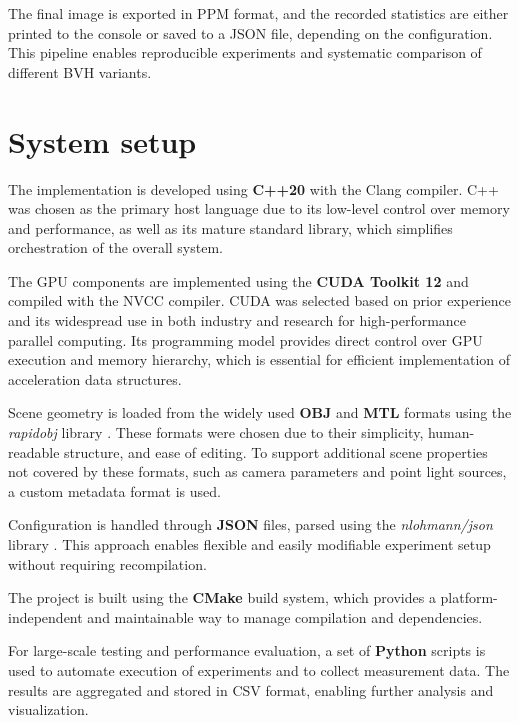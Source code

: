 The final image is exported in PPM format, and the recorded statistics are either printed to the console or saved to a JSON file, depending on the configuration. This pipeline enables reproducible experiments and systematic comparison of different BVH variants.

\section{System setup}

The implementation is developed using \textbf{C++20} with the Clang compiler. C++ was chosen as the primary host language due to its low-level control over memory and performance, as well as its mature standard library, which simplifies orchestration of the overall system.

The GPU components are implemented using the \textbf{CUDA Toolkit 12} and compiled with the NVCC compiler. CUDA was selected based on prior experience and its widespread use in both industry and research for high-performance parallel computing. Its programming model provides direct control over GPU execution and memory hierarchy, which is essential for efficient implementation of acceleration data structures.

Scene geometry is loaded from the widely used \textbf{OBJ} and \textbf{MTL} formats \cite{mtl_obj} using the \textit{rapidobj} library \cite{rapidobj}. These formats were chosen due to their simplicity, human-readable structure, and ease of editing. To support additional scene properties not covered by these formats, such as camera parameters and point light sources, a custom metadata format is used.

Configuration is handled through \textbf{JSON} files, parsed using the \textit{nlohmann/json} library \cite{nlohmann_json}. This approach enables flexible and easily modifiable experiment setup without requiring recompilation.

The project is built using the \textbf{CMake} build system, which provides a platform-independent and maintainable way to manage compilation and dependencies.

For large-scale testing and performance evaluation, a set of \textbf{Python} scripts is used to automate execution of experiments and to collect measurement data. The results are aggregated and stored in CSV format, enabling further analysis and visualization.
